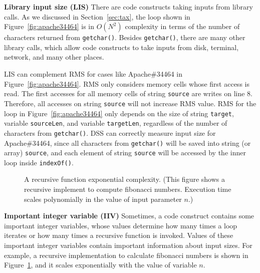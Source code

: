 \noindent\textbf{Library input size (LIS)}
There are code constructs taking inputs from library calls. 
As we discussed in Section~\ref{sec:tax}, 
the loop shown in Figure~\ref{fig:apache34464} 
is in $O(N^2)$ complexity in terms of the number 
of characters returned from \texttt{getchar()}. 
Besides \texttt{getchar()}, there are many other library calls, 
which allow code constructs to take inputs
from disk, terminal, network, and many other places. 

LIS can complement RMS for cases like Apache\#34464 in Figure~\ref{fig:apache34464}.
RMS only considers memory cells whose first access is read. 
The first accesses for all memory cells of string \texttt{source} are writes on line $8$.
Therefore, all accesses on string 
\texttt{source} will not increase RMS value.  
RMS for the loop in Figure~\ref{fig:apache34464} only depends 
on the size of string \texttt{target}, 
variable \texttt{sourceLen}, and variable \texttt{targetLen}, 
regardless of the number of characters from \texttt{getchar()}.
DSS can correctly measure input size for Apache\#34464,
since all characters from \texttt{getchar()} will be saved into 
string (or array) \texttt{source},
and each element of string \texttt{source} 
will be accessed by the inner loop inside \texttt{indexOf()}. 


\begin{figure}
\centering
{}
  \mbox{}
  \vspace{-0.1in}
\caption{A recursive function exponential complexity.
\footnotesize{(This figure shows a recursive implement to compute fibonacci numbers. 
Execution time scales polynomially in the value of input parameter $n$.)}}
\vspace{-0.1in}
\label{fig:fib}
\vspace{-0.15in}
\end{figure}


\noindent\textbf{Important integer variable (IIV)}
Sometimes, a code construct contains some important integer variables,
whose values determine how many times a loop iterates 
or how many times a recursive function is invoked. 
Values of these important integer variables contain important information about input sizes. 
For example, a recursive implementation to calculate fibonacci numbers is shown in Figure~\ref{fig:fib}, 
and it scales exponentially with the value of variable $n$.

